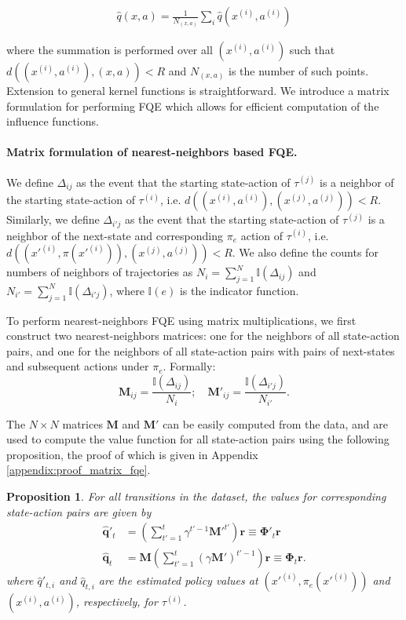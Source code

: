 \documentclass{article}
\newtheorem{proposition}{Proposition}
\begin{document}
\begin{align}
    \hat{q}(x, a) = \frac{1}{N_{(x, a)}} \sum_{i} \hat{q}(x^{(i)}, a^{(i)})
\end{align}

where the summation is performed over all $(x^{(i)}, a^{(i)})$ such that $d((x^{(i)}, a^{(i)}),(x, a)) < R$ and $N_{(x, a)}$ is the number of such points. Extension to general kernel functions is straightforward. We introduce a matrix formulation for performing FQE which allows for efficient computation of the influence functions.

\paragraph{Matrix formulation of nearest-neighbors based FQE.}

We define $\Delta_{i j}$ as the event that the starting state-action of $\tau^{(j)}$ is a neighbor of the starting state-action of $\tau^{(i)}$, i.e. $d((x^{(i)}, a^{(i)}), (x^{(j)}, a^{(j)})) < R$. Similarly, we define $\Delta_{i' j}$ as the event that the starting state-action of $\tau^{(j)}$ is a neighbor of the next-state and corresponding $\pi_e$ action of $\tau^{(i)}$, i.e. $d((x'^{(i)}, \pi(x'^{(i)})), (x^{(j)}, a^{(j)})) < R$. We also define the counts for numbers of neighbors of trajectories as $N_i = \sum_{j=1}^N \mathbb{I} (\Delta_{i j})$ and $N_{i'} = \sum_{j=1}^N \mathbb{I} (\Delta_{i' j})$, where $\mathbb{I}(e)$ is the indicator function.

To perform nearest-neighbors FQE using matrix multiplications, we first construct two nearest-neighbors matrices: one for the neighbors of all state-action pairs, and one for the neighbors of all state-action pairs with pairs of next-states and subsequent actions under $\pi_e$. Formally:
\begin{equation}
    \mathbf{M}_{i j} = \frac{\mathbb{I} (\Delta_{i j})}{N_i}; \quad \mathbf{M}'_{i j} = \frac{\mathbb{I} (\Delta_{i' j})}{N_{i'}}.
\end{equation}

The $N \times N$ matrices $\mathbf{M}$ and $\mathbf{M}'$ can be easily computed from the data, and are used to compute the value function for all state-action pairs using the following proposition, the proof of which is given in Appendix \ref{appendix:proof_matrix_fqe}.

\begin{proposition}
\label{prop:matrix_fqe}
For all transitions in the dataset, the values for corresponding state-action pairs are given by
\begin{align}
    \mathbf{\hat{q}}'_t &= \left( \sum_{t'=1}^t \gamma^{t'-1} \mathbf{M}'^{t'} \right) \mathbf{r} \equiv \mathbf{\Phi}'_t \mathbf{r} \label{eq:q_prime_estimate_main} \\
    \mathbf{\hat{q}}_t &= \mathbf{M} \left( \sum_{t'=1}^t \left( \gamma \mathbf{M}' \right)^{t'-1} \right) \mathbf{r} \equiv \mathbf{\Phi}_t \mathbf{r}. \label{eq:q_estimate}
\end{align}
where $\hat{q}'_{t, i}$ and $\hat{q}_{t, i}$ are the estimated policy values at $(x'^{(i)}, \pi_e(x'^{(i)}))$ and $(x^{(i)}, a^{(i)})$, respectively, for $\tau^{(i)}$.
\end{proposition}
\end{document}

